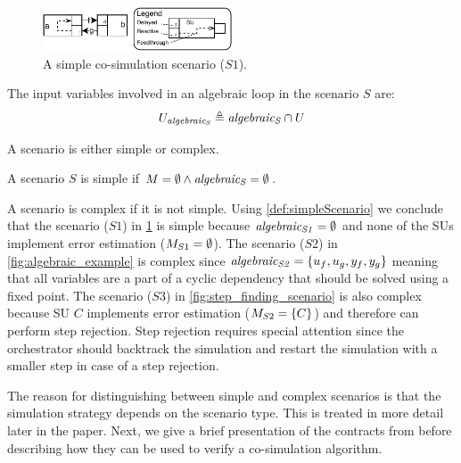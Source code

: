 \begin{figure}
  \includegraphics[width=0.5\textwidth]{images/simple_example.pdf}
  \caption{A simple co-simulation scenario ($S1$).}
  \label{fig:simpleexample}  
\end{figure}

The input variables involved in an algebraic loop in the scenario $S$ are:
\begin{align}
  U_{\mathit{algebraic_{S}}} \triangleq \mathit{algebraic_{S}} \cap U
\end{align}

A scenario is either simple or complex.
\begin{definition}\label{def:simpleScenario}
  A scenario $S$ is simple if $M = \emptyset \land \mathit{algebraic_{S}} = \emptyset$.
\end{definition}

A scenario is complex if it is not simple. Using \cref{def:simpleScenario} we conclude that the scenario ($S1$) in \cref{fig:simpleexample} is simple because $\mathit{algebraic_{S1}}=\emptyset$ and none of the SUs implement error estimation ($M_{S1}=\emptyset$). The scenario ($S2$) in \cref{fig:algebraic_example} is complex since $\mathit{algebraic_{S2}}=\{u_{f}, u_{g}, y_{f}, y_{g}\}$ meaning that all variables are a part of a cyclic dependency that should be solved using a fixed point.
The scenario ($S3$) in \cref{fig:step_finding_scenario} is also complex because SU $C$ implements error estimation ($M_{S2}=\{C\}$) and therefore can perform step rejection. Step rejection requires special attention since the orchestrator should backtrack the simulation and restart the simulation with a smaller step in case of a step rejection.

The reason for distinguishing between simple and complex scenarios is that the simulation strategy depends on the scenario type. This is treated in more detail later in the paper.
Next, we give a brief presentation of the contracts from \cite{Gomes2019a} before describing how they can be used to verify a co-simulation algorithm.

